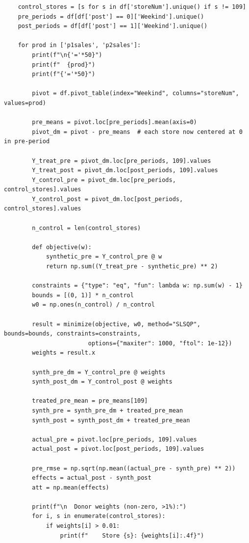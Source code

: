 \documentclass[10pt]{article}
\begin{document}
\begin{lstlisting}
    control_stores = [s for s in df['storeNum'].unique() if s != 109]
    pre_periods = df[df['post'] == 0]['Weekind'].unique()
    post_periods = df[df['post'] == 1]['Weekind'].unique()

    for prod in ['p1sales', 'p2sales']:
        print(f"\n{'='*50}")
        print(f"  {prod}")
        print(f"{'='*50}")
        
        pivot = df.pivot_table(index="Weekind", columns="storeNum", values=prod)
        
        pre_means = pivot.loc[pre_periods].mean(axis=0)
        pivot_dm = pivot - pre_means  # each store now centered at 0 in pre-period
        
        Y_treat_pre = pivot_dm.loc[pre_periods, 109].values
        Y_treat_post = pivot_dm.loc[post_periods, 109].values
        Y_control_pre = pivot_dm.loc[pre_periods, control_stores].values
        Y_control_post = pivot_dm.loc[post_periods, control_stores].values
        
        n_control = len(control_stores)
        
        def objective(w):
            synthetic_pre = Y_control_pre @ w
            return np.sum((Y_treat_pre - synthetic_pre) ** 2)
        
        constraints = {"type": "eq", "fun": lambda w: np.sum(w) - 1}
        bounds = [(0, 1)] * n_control
        w0 = np.ones(n_control) / n_control
        
        result = minimize(objective, w0, method="SLSQP", bounds=bounds, constraints=constraints,
                        options={"maxiter": 1000, "ftol": 1e-12})
        weights = result.x
        
        synth_pre_dm = Y_control_pre @ weights
        synth_post_dm = Y_control_post @ weights
        
        treated_pre_mean = pre_means[109]
        synth_pre = synth_pre_dm + treated_pre_mean
        synth_post = synth_post_dm + treated_pre_mean
        
        actual_pre = pivot.loc[pre_periods, 109].values
        actual_post = pivot.loc[post_periods, 109].values
        
        pre_rmse = np.sqrt(np.mean((actual_pre - synth_pre) ** 2))
        effects = actual_post - synth_post
        att = np.mean(effects)
        
        print(f"\n  Donor weights (non-zero, >1%):")
        for i, s in enumerate(control_stores):
            if weights[i] > 0.01:
                print(f"    Store {s}: {weights[i]:.4f}")
        

\end{lstlisting}
\end{document}

